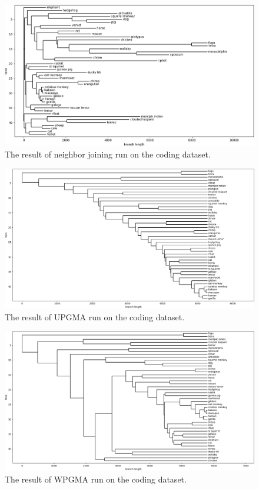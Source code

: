 \documentclass[11pt,twocolumn]{article}
\begin{document}
\begin{figure}
    \centering
    \includegraphics[width=\linewidth]{img/nj.png}
    \caption{The result of neighbor joining run on the coding dataset.}
    \label{fig:nj}
\end{figure}

\begin{figure}
    \centering
    \includegraphics[width=\linewidth]{img/upgma.png}
    \caption{The result of UPGMA run on the coding dataset.}
    \label{fig:upgma}
\end{figure}

\begin{figure}
    \centering
    \includegraphics[width=\linewidth]{img/wpgma.png}
    \caption{The result of WPGMA run on the coding dataset.}
    \label{fig:wpgma}
\end{figure}
\end{document}

